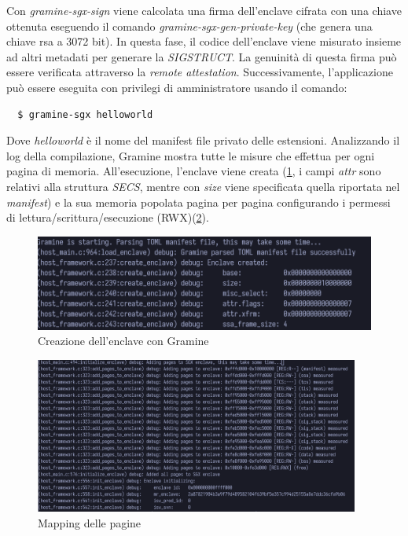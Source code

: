 \documentclass{article}
\begin{document}


Con \textit{gramine-sgx-sign} viene calcolata una firma dell'enclave cifrata con una chiave ottenuta eseguendo il comando \textit{gramine-sgx-gen-private-key} (che genera una chiave rsa a 3072 bit). In questa fase, il codice dell'enclave viene misurato insieme ad altri metadati per generare la \textit{SIGSTRUCT}. La genuinità di questa firma può essere verificata attraverso la \textit{remote attestation}. Successivamente, l'applicazione può essere eseguita con privilegi di amministratore usando il comando:
\begin{verbatim}
  $ gramine-sgx helloworld
\end{verbatim}
Dove \textit{helloworld} è il nome del manifest file privato delle estensioni. Analizzando il log della compilazione, Gramine mostra tutte le misure che effettua per ogni pagina di memoria. All'esecuzione, l'enclave viene creata (\cref{fig:gramine-helloworld-create-enclave}, i campi \textit{attr} sono relativi alla struttura \textit{SECS}, mentre con \textit{size} viene specificata quella riportata nel \textit{manifest}) e la sua memoria popolata pagina per pagina configurando i permessi di lettura/scrittura/esecuzione (RWX)(\cref{fig:gramine-helloworld-create-enclave-page-mapping}).

\begin{figure}
  \begin{center}
    \includegraphics[width=.95\textwidth]{figures/ch3/gramine-helloworld-create-enclave.png}
  \end{center}
  \caption{Creazione dell'enclave con Gramine}\label{fig:gramine-helloworld-create-enclave}
\end{figure}

\begin{figure}[H]
  \begin{center}
    \includegraphics[width=0.95\textwidth]{figures/ch3/gramine-helloworld-create-enclave-page-mapping.png}
  \end{center}
  \caption{Mapping delle pagine}\label{fig:gramine-helloworld-create-enclave-page-mapping}
\end{figure}
\end{document}
